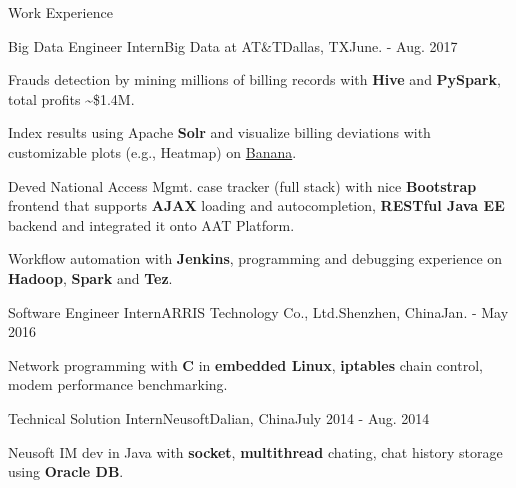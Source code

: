 \documentclass{resume} %
\begin{document}



\begin{rSection}{Work Experience}
\begin{rSubsection}{Big Data Engineer Intern}{Big Data at AT\&T}{Dallas, TX}{June. - Aug. 2017}
\item Frauds detection by mining millions of billing records with \textbf{Hive} and \textbf{PySpark}, total profits \textasciitilde \$1.4M.
\item Index results using Apache \textbf{Solr} and visualize billing deviations with customizable plots (e.g., Heatmap) on \href{https://github.com/lucidworks/banana}{Banana}.
\item Deved National Access Mgmt. case tracker (full stack) with nice \textbf{Bootstrap} frontend that supports \textbf{AJAX} loading and autocompletion, \textbf{RESTful Java EE} backend and integrated it onto AAT Platform.
\item Workflow automation with \textbf{Jenkins}, programming and debugging experience on \textbf{Hadoop}, \textbf{Spark} and \textbf{Tez}.
\end{rSubsection}

\begin{rSubsection}{Software Engineer Intern}{ARRIS Technology Co., Ltd.}{Shenzhen, China}{Jan. - May 2016}
\item Network programming with \textbf{C} in \textbf{embedded Linux}, \textbf{iptables} chain control, modem performance benchmarking.
\end{rSubsection}

\begin{rSubsection}{Technical Solution Intern}{Neusoft}{Dalian, China}{July 2014 - Aug. 2014}
\item Neusoft IM dev in Java with \textbf{socket}, \textbf{multithread} chating, chat history storage using \textbf{Oracle DB}.
\end{rSubsection}
\end{rSection}
\end{document}
